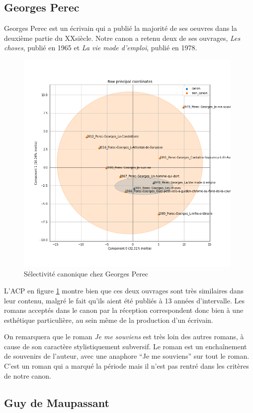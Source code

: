 \subsection{Georges Perec}

Georges Perec est un écrivain qui a publié la majorité de ses oeuvres dans la deuxième partie du XX\ieme siècle. Notre canon a retenu deux de ses ouvrages, \textit{Les choses}, publié en 1965 et \textit{La vie mode d'emploi}, publié en 1978.

\bigskip
\begin{figure}[!ht]
    \centering
    \includegraphics[width=11cm]{img/16_pca_Perec.png}
    \caption{Sélectivité canonique chez Georges Perec}
    \label{perec}
\end{figure}

L'ACP en figure \ref{perec} montre bien que ces deux ouvrages sont très similaires dans leur contenu, malgré le fait qu'ils aient été publiés à 13 années d'intervalle. Les romans acceptés dans le canon par la réception correspondent donc bien à une esthétique particulière, au sein même de la production d'un écrivain.

On remarquera que le roman \textit{Je me souviens} est très loin des autres romans, à cause de son caractère stylistiquement subversif. Le roman est un enchaînement de souvenirs de l'auteur, avec une anaphore \enquote{Je me souviens} sur tout le roman. 
C'est un roman qui a marqué la période mais il n'est pas rentré dans les critères de notre canon. 


\subsection{Guy de Maupassant}


